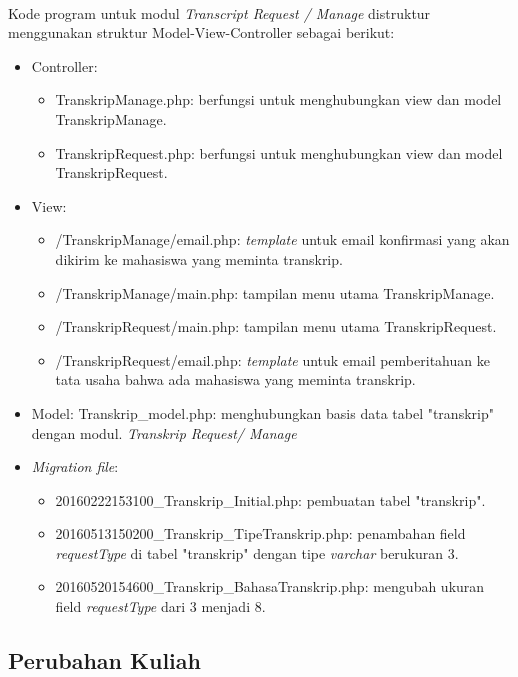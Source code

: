 \paragraph{}Kode program untuk modul \textit{Transcript Request / Manage} distruktur menggunakan struktur Model-View-Controller sebagai berikut:
\begin{itemize}
	\item Controller:
		\begin{itemize}
			\item TranskripManage.php: berfungsi untuk menghubungkan view dan model TranskripManage.
			\item TranskripRequest.php: berfungsi untuk menghubungkan view dan model TranskripRequest.
		\end{itemize}
	\item View:
		\begin{itemize}
			\item /TranskripManage/email.php: \textit{template} untuk email konfirmasi yang akan dikirim ke mahasiswa yang meminta transkrip.
			\item /TranskripManage/main.php: tampilan menu utama TranskripManage.
			\item /TranskripRequest/main.php: tampilan menu utama TranskripRequest.
			\item /TranskripRequest/email.php: \textit{template} untuk email pemberitahuan ke tata usaha bahwa ada mahasiswa yang meminta transkrip.
		\end{itemize}
	\item Model: Transkrip\_model.php: menghubungkan basis data tabel "transkrip" dengan modul. \textit{Transkrip Request/ Manage}
	\item \textit{Migration file}:
		\begin{itemize}
			\item 20160222153100\_Transkrip\_Initial.php: pembuatan tabel "transkrip".
			\item 20160513150200\_Transkrip\_TipeTranskrip.php: penambahan field \textit{requestType} di tabel "transkrip" dengan tipe \textit{varchar} berukuran 3.
			\item 20160520154600\_Transkrip\_BahasaTranskrip.php: mengubah ukuran field \textit{requestType} dari 3 menjadi 8.
		\end{itemize}
\end{itemize}

\subsection{Perubahan Kuliah}
